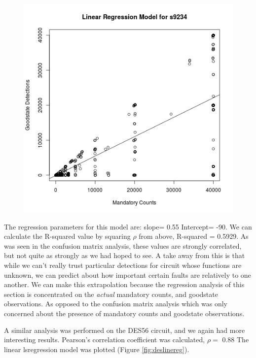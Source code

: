     \begin{figure}[h!]
    \centering
    \caption{\label{fig:s9234linereg}}
    \includegraphics[scale=0.5]{Figures/s9234linereg.png}
    \end{figure}  

    The regression parameters for this model are: slope= 0.55 Intercept= -90.
    We can calculate the R-squared value by squaring $\rho$ from above, R-squared = 0.5929. 
    As was seen in the confusion matrix analysis, these values are strongly correlated, but not quite as strongly as we had hoped to see. 
    A take away from this is that while we can't really trust particular detections for circuit whose functions are unknown, we can predict about how important certain faults are relatively to one another.
    We can make this extrapolation because the regression analysis of this section is concentrated on the \textit{actual} mandatory counts, and goodstate observations.
    As opposed to the confusion matrix analysis which was only concerned about the presence of mandatory counts and goodstate observations.


    A similar analysis was performed on the DES56 circuit, and we again had more interesting results. 
    Pearson's correlation coefficient was calculated, $\rho = $ 0.88
    The linear lsregression model was plotted (Figure \ref{fig:deslinereg}).


